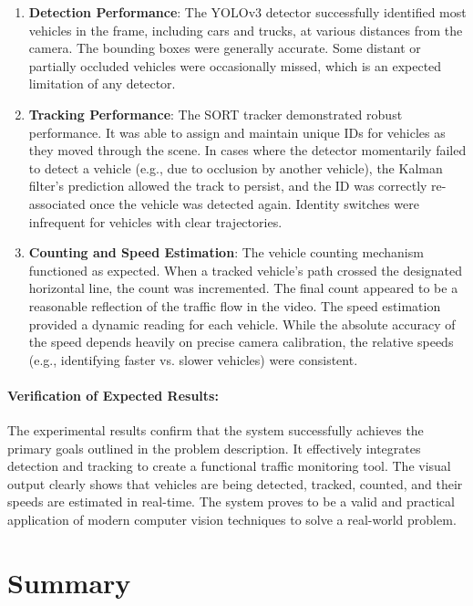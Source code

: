 \documentclass{article}
\begin{document}
\begin{enumerate}
    \item \textbf{Detection Performance}: The YOLOv3 detector successfully identified most vehicles in the frame, including cars and trucks, at various distances from the camera. The bounding boxes were generally accurate. Some distant or partially occluded vehicles were occasionally missed, which is an expected limitation of any detector.

    \item \textbf{Tracking Performance}: The SORT tracker demonstrated robust performance. It was able to assign and maintain unique IDs for vehicles as they moved through the scene. In cases where the detector momentarily failed to detect a vehicle (e.g., due to occlusion by another vehicle), the Kalman filter's prediction allowed the track to persist, and the ID was correctly re-associated once the vehicle was detected again. Identity switches were infrequent for vehicles with clear trajectories.

    \item \textbf{Counting and Speed Estimation}: The vehicle counting mechanism functioned as expected. When a tracked vehicle's path crossed the designated horizontal line, the count was incremented. The final count appeared to be a reasonable reflection of the traffic flow in the video. The speed estimation provided a dynamic reading for each vehicle. While the absolute accuracy of the speed depends heavily on precise camera calibration, the relative speeds (e.g., identifying faster vs. slower vehicles) were consistent.
\end{enumerate}

\paragraph{Verification of Expected Results:}
The experimental results confirm that the system successfully achieves the primary goals outlined in the problem description. It effectively integrates detection and tracking to create a functional traffic monitoring tool. The visual output clearly shows that vehicles are being detected, tracked, counted, and their speeds are estimated in real-time. The system proves to be a valid and practical application of modern computer vision techniques to solve a real-world problem.

\section{Summary}
\end{document}
